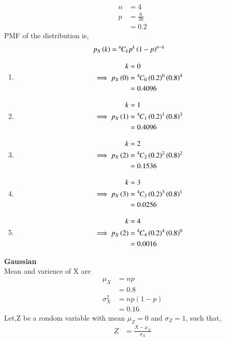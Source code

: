 \documentclass[journal,11pt,onecolumn]{IEEEtran}
\providecommand{\brak}[1]{\ensuremath{\left(#1\right)}}
\newcommand*{\permcomb}[4][0mu]{{{}^{#3}\mkern#1#2_{#4}}}
\newcommand*{\comb}[1][-1mu]{\permcomb[#1]{C}}
\begin{document}
\begin{align}
	n&=4\\
	p&=\frac{6}{30}\\
	&=0.2
\end{align}
PMF of the distribution is,
\begin{align}
	p_X\brak{k}&=\comb{n}{k}p^k\brak{1-p}^{n-k}
\end{align}
\begin{enumerate}
	\item
	\begin{align}
	k&=0\\
	\implies p_X\brak{0}&=\comb{4}{0}\brak{0.2}^0\brak{0.8}^4\\
	&=0.4096
\end{align}
	\item
	\begin{align}
	k&=1\\
	\implies p_X\brak{1}&=\comb{4}{1}\brak{0.2}^1\brak{0.8}^3\\
	&=0.4096
\end{align}
	\item
	\begin{align}
	k&=2\\
	\implies p_X\brak{2}&=\comb{4}{2}\brak{0.2}^2\brak{0.8}^2\\
	&=0.1536
\end{align}
\item
	\begin{align}
	k&=3\\
	\implies p_X\brak{3}&=\comb{4}{3}\brak{0.2}^3\brak{0.8}^1\\
	&=0.0256
\end{align}
\item
	\begin{align}
	k&=4\\
	\implies p_X\brak{2}&=\comb{4}{4}\brak{0.2}^4\brak{0.8}^0\\
	&=0.0016
\end{align}
\end{enumerate}
\textbf{Gaussian}\\
Mean and varience of X are
\begin{align}
	\mu_X&=np\\
	&=0.8\\
	\sigma^2_X&=np\brak{1-p}\\
	&=0.16
\end{align}
Let,Z be a rondom variable with mean $\mu_Z = 0$ and $\sigma_Z=1$, such that,
\begin{align}
	Z&=\frac{X- \mu_X}{\sigma_X}
\end{align}
\end{document}
